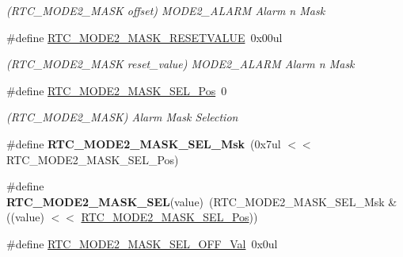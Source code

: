 \begin{DoxyCompactItemize}
\begin{DoxyCompactList}\small\item\em (R\+T\+C\+\_\+\+M\+O\+D\+E2\+\_\+\+M\+A\+S\+K offset) M\+O\+D\+E2\+\_\+\+A\+L\+A\+R\+M Alarm n Mask \end{DoxyCompactList}\item 
\hypertarget{group___s_a_m_l21___r_t_c_ga911d5cb1189a0abe818932f00169427b}{}\#define \hyperlink{group___s_a_m_l21___r_t_c_ga911d5cb1189a0abe818932f00169427b}{R\+T\+C\+\_\+\+M\+O\+D\+E2\+\_\+\+M\+A\+S\+K\+\_\+\+R\+E\+S\+E\+T\+V\+A\+L\+U\+E}~0x00ul\label{group___s_a_m_l21___r_t_c_ga911d5cb1189a0abe818932f00169427b}

\begin{DoxyCompactList}\small\item\em (R\+T\+C\+\_\+\+M\+O\+D\+E2\+\_\+\+M\+A\+S\+K reset\+\_\+value) M\+O\+D\+E2\+\_\+\+A\+L\+A\+R\+M Alarm n Mask \end{DoxyCompactList}\item 
\hypertarget{group___s_a_m_l21___r_t_c_ga34aaed36d41b5e7dad831c960d609d15}{}\#define \hyperlink{group___s_a_m_l21___r_t_c_ga34aaed36d41b5e7dad831c960d609d15}{R\+T\+C\+\_\+\+M\+O\+D\+E2\+\_\+\+M\+A\+S\+K\+\_\+\+S\+E\+L\+\_\+\+Pos}~0\label{group___s_a_m_l21___r_t_c_ga34aaed36d41b5e7dad831c960d609d15}

\begin{DoxyCompactList}\small\item\em (R\+T\+C\+\_\+\+M\+O\+D\+E2\+\_\+\+M\+A\+S\+K) Alarm Mask Selection \end{DoxyCompactList}\item 
\hypertarget{group___s_a_m_l21___r_t_c_ga595e9d79a018a555b53a5402666a1f1e}{}\#define {\bfseries R\+T\+C\+\_\+\+M\+O\+D\+E2\+\_\+\+M\+A\+S\+K\+\_\+\+S\+E\+L\+\_\+\+Msk}~(0x7ul $<$$<$ R\+T\+C\+\_\+\+M\+O\+D\+E2\+\_\+\+M\+A\+S\+K\+\_\+\+S\+E\+L\+\_\+\+Pos)\label{group___s_a_m_l21___r_t_c_ga595e9d79a018a555b53a5402666a1f1e}

\item 
\hypertarget{group___s_a_m_l21___r_t_c_ga6db84de0039137eb055480998368bcf5}{}\#define {\bfseries R\+T\+C\+\_\+\+M\+O\+D\+E2\+\_\+\+M\+A\+S\+K\+\_\+\+S\+E\+L}(value)~(R\+T\+C\+\_\+\+M\+O\+D\+E2\+\_\+\+M\+A\+S\+K\+\_\+\+S\+E\+L\+\_\+\+Msk \& ((value) $<$$<$ \hyperlink{group___s_a_m_l21___r_t_c_ga34aaed36d41b5e7dad831c960d609d15}{R\+T\+C\+\_\+\+M\+O\+D\+E2\+\_\+\+M\+A\+S\+K\+\_\+\+S\+E\+L\+\_\+\+Pos}))\label{group___s_a_m_l21___r_t_c_ga6db84de0039137eb055480998368bcf5}

\item 
\hypertarget{group___s_a_m_l21___r_t_c_ga207406f608156bb1d464023f3348deba}{}\#define \hyperlink{group___s_a_m_l21___r_t_c_ga207406f608156bb1d464023f3348deba}{R\+T\+C\+\_\+\+M\+O\+D\+E2\+\_\+\+M\+A\+S\+K\+\_\+\+S\+E\+L\+\_\+\+O\+F\+F\+\_\+\+Val}~0x0ul\label{group___s_a_m_l21___r_t_c_ga207406f608156bb1d464023f3348deba}


\end{DoxyCompactItemize}
